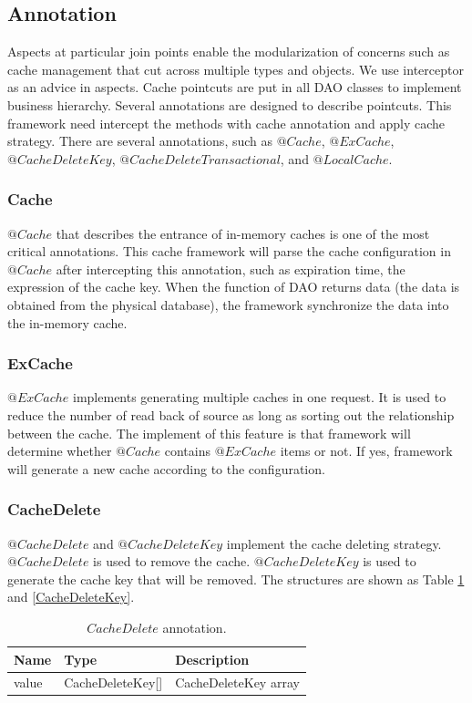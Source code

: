 \documentclass{singlecol-new}
\theoremstyle{TH}{
\newtheorem{lemma}{Lemma}
\newtheorem{theorem}[lemma]{Theorem}
\newtheorem{corrolary}[lemma]{Corrolary}
\newtheorem{conjecture}[lemma]{Conjecture}
\newtheorem{proposition}[lemma]{Proposition}
\newtheorem{claim}[lemma]{Claim}
\newtheorem{stheorem}[lemma]{Wrong Theorem}
}
\theoremstyle{THrm}{
\newtheorem{definition}{Definition}[section]
\newtheorem{question}{Question}[section]
\newtheorem{remark}{Remark}
\newtheorem{scheme}{Scheme}
}
\theoremstyle{THhit}{
\newtheorem{case}{Case}[section]
}
\begin{document}
\subsection{Annotation}
Aspects at particular join points enable the modularization of concerns such as cache management that cut across multiple types and objects. We use interceptor as an advice in aspects. Cache pointcuts are put in all DAO classes to implement business hierarchy. Several annotations are designed to describe pointcuts. This framework need intercept the methods with cache annotation and apply cache strategy. There are several annotations, such as $@Cache$, $@ExCache$, $@CacheDeleteKey$, $@CacheDeleteTransactional$, and $@LocalCache$.

\subsubsection{Cache}
$@Cache$ that describes the entrance of in-memory caches is one of the most critical annotations. This cache framework will parse the cache configuration in $@Cache$ after intercepting this annotation, such as expiration time, the expression of the cache key. When the function of DAO returns data (the data is obtained from the physical database), the framework synchronize the data into the in-memory cache.

\subsubsection{ExCache}
$@ExCache$ implements generating multiple caches in one request. It is used to reduce the number of read back of source as long as sorting out the relationship between the cache. The implement of this feature is that framework will determine whether $@Cache$ contains $@ExCache$ items or not. If yes, framework will generate a new cache according to the configuration.

\subsubsection{CacheDelete}
$@CacheDelete$ and $@CacheDeleteKey$ implement the cache deleting strategy. $@CacheDelete$ is used to remove the cache. $@CacheDeleteKey$ is used to generate the cache key that will be removed. The structures are shown as Table \ref{CacheDelete} and \ref{CacheDeleteKey}.

\begin{table}[htb]
\begin{center}
 \caption{\label{CacheDelete}$CacheDelete$ annotation.}
 \begin{tabular}{lll}
 \toprule
Name & Type & Description\\
 \midrule
value & CacheDeleteKey[] & CacheDeleteKey array\\
\bottomrule
 \end{tabular}
\end{center}
\end{table}
\end{document}
